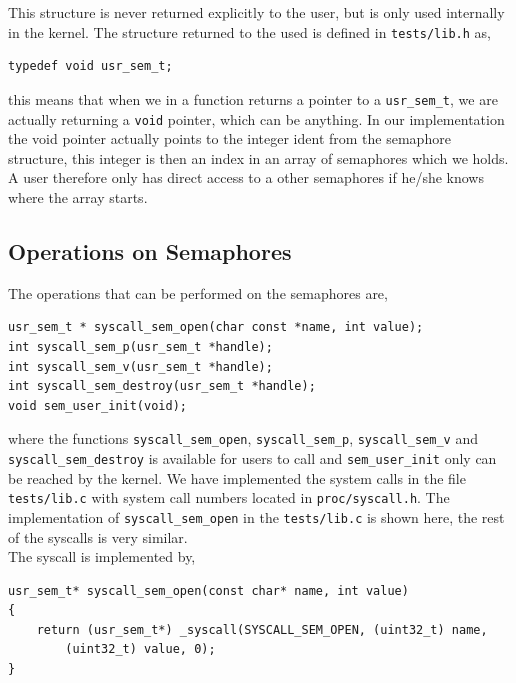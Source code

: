 \documentclass[11pt]{article}
\begin{document}
    This structure is never returned explicitly to the user, but is only used
    internally in the kernel.  The structure returned to the used is defined in
    \texttt{tests/lib.h} as,

    \begin{lstlisting}[style=customc]
typedef void usr_sem_t;
    \end{lstlisting}

    this means that when we in a function returns a pointer to a
    \texttt{usr\_sem\_t}, we are actually returning a \texttt{void} pointer,
    which can be anything.  In our implementation the void pointer actually
    points to the integer ident from the semaphore structure, this integer is
    then an index in an array of semaphores which we holds.  A user therefore
    only has direct access to a other semaphores if he/she knows where the array
    starts.

    \subsection{Operations on Semaphores}
    The operations that can be performed on the semaphores are,

    \begin{lstlisting}[style=customc]
usr_sem_t * syscall_sem_open(char const *name, int value);
int syscall_sem_p(usr_sem_t *handle);
int syscall_sem_v(usr_sem_t *handle);
int syscall_sem_destroy(usr_sem_t *handle);
void sem_user_init(void);
    \end{lstlisting}

    where the functions \texttt{syscall\_sem\_open}, \texttt{syscall\_sem\_p},
    \texttt{syscall\_sem\_v} and \texttt{syscall\_sem\_destroy} is available for
    users to call and \texttt{sem\_user\_init} only can be reached by the
    kernel.  We have implemented the system calls in the file
    \texttt{tests/lib.c} with system call numbers located in
    \texttt{proc/syscall.h}.  The implementation of \texttt{syscall\_sem\_open}
    in the \texttt{tests/lib.c} is shown here, the rest of the syscalls is very
    similar. \\

    The syscall is implemented by,

    \begin{lstlisting}[style=customc]
usr_sem_t* syscall_sem_open(const char* name, int value)
{
    return (usr_sem_t*) _syscall(SYSCALL_SEM_OPEN, (uint32_t) name,
        (uint32_t) value, 0);
}
    \end{lstlisting}
\end{document}
